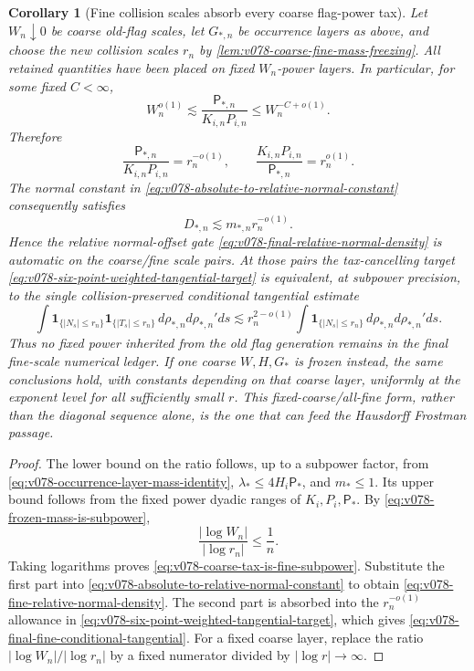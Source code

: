 \documentclass[10pt]{article}
\newtheorem{corollary}[theorem]{Corollary}
\begin{document}
\begin{corollary}[Fine collision scales absorb every coarse flag-power tax]
\label{cor:v078-fine-scale-absorbs-coarse-tax}
Let \(W_n\downarrow0\) be coarse old-flag scales, let \(G_{*,n}\) be occurrence layers as above, and
choose the new collision scales \(r_n\) by
\cref{lem:v078-coarse-fine-mass-freezing}.  All retained quantities have been placed on fixed
\(W_n\)-power layers.  In particular, for some fixed \(C<\infty\),
\[
W_n^{o(1)}
\lesssim
\frac{\mathsf P_{*,n}}{K_{i,n}P_{i,n}}
\le
W_n^{-C+o(1)}.
\]
Therefore
\begin{equation}
\label{eq:v078-coarse-tax-is-fine-subpower}
\boxed{
\frac{\mathsf P_{*,n}}{K_{i,n}P_{i,n}}
=
r_n^{-o(1)},
\qquad
\frac{K_{i,n}P_{i,n}}{\mathsf P_{*,n}}
=
r_n^{o(1)}.
}
\end{equation}
The normal constant in
\eqref{eq:v078-absolute-to-relative-normal-constant} consequently satisfies
\begin{equation}
\label{eq:v078-fine-relative-normal-density}
\boxed{
D_{*,n}
\lesssim
m_{*,n}r_n^{-o(1)}.
}
\end{equation}
Hence the relative normal-offset gate
\eqref{eq:v078-final-relative-normal-density} is automatic on the coarse/fine scale pairs.  At
those pairs the tax-cancelling target
\eqref{eq:v078-six-point-weighted-tangential-target} is equivalent, at subpower precision, to the
single collision-preserved conditional tangential estimate
\begin{equation}
\label{eq:v078-final-fine-conditional-tangential}
\boxed{
\int
\mathbf 1_{\{|N_s|\le r_n\}}
\mathbf 1_{\{|T_s|\le r_n\}}
\,d\rho_{*,n}d\rho_{*,n}'ds
\lesssim
r_n^{2-o(1)}
\int
\mathbf 1_{\{|N_s|\le r_n\}}
\,d\rho_{*,n}d\rho_{*,n}'ds.
}
\end{equation}
Thus no fixed power inherited from the old flag generation remains in the final fine-scale
numerical ledger.  If one coarse \(W,H,G_*\) is frozen instead, the same conclusions hold, with
constants depending on that coarse layer, uniformly at the exponent level for all sufficiently
small \(r\).  This fixed-coarse/all-fine form, rather than the diagonal sequence alone, is the one
that can feed the Hausdorff Frostman passage.
\end{corollary}

\begin{proof}
The lower bound on the ratio follows, up to a subpower factor, from
\eqref{eq:v078-occurrence-layer-mass-identity},
\(\lambda_*\le4H_i\mathsf P_*\), and \(m_*\le1\).  Its upper bound follows from the fixed power
dyadic ranges of \(K_i,P_i,\mathsf P_*\).  By
\eqref{eq:v078-frozen-mass-is-subpower},
\[
\frac{|\log W_n|}{|\log r_n|}
\le
\frac1n.
\]
Taking logarithms proves \eqref{eq:v078-coarse-tax-is-fine-subpower}.  Substitute the first part
into \eqref{eq:v078-absolute-to-relative-normal-constant} to obtain
\eqref{eq:v078-fine-relative-normal-density}.  The second part is absorbed into the \(r_n^{-o(1)}\)
allowance in \eqref{eq:v078-six-point-weighted-tangential-target}, which gives
\eqref{eq:v078-final-fine-conditional-tangential}.  For a fixed coarse layer, replace the ratio
\(|\log W_n|/|\log r_n|\) by a fixed numerator divided by \(|\log r|\to\infty\).
\end{proof}
\end{document}
